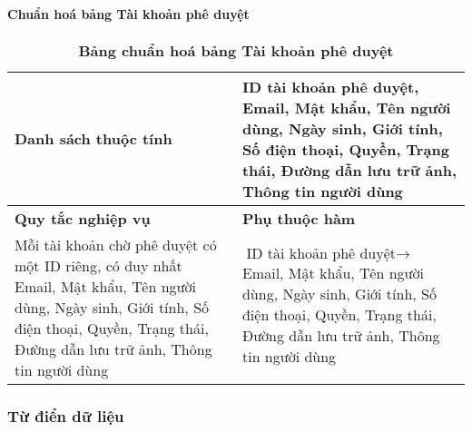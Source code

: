 \paragraph{Chuẩn hoá bảng Tài khoản phê duyệt}
\mbox{}
\begin{table}[H]
  \caption{\bfseries \fontsize{12pt}{0pt}\selectfont Bảng chuẩn hoá bảng Tài khoản phê duyệt}
  \centering
  \begin{tabularx}{0.9\textwidth}{|X|X|}
    \hline
    \textbf{Danh sách thuộc tính} & ID tài khoản phê duyệt, Email, Mật khẩu, Tên người dùng, Ngày sinh, Giới tính, Số điện thoại, Quyền, Trạng thái, Đường dẫn lưu trữ ảnh, Thông tin người dùng \\
    \hline
    \textbf{Quy tắc nghiệp vụ} & \textbf{Phụ thuộc hàm} \\
    \hline
    Mỗi tài khoản chờ phê duyệt có một ID riêng, có duy nhất Email, Mật khẩu, Tên người dùng, Ngày sinh, Giới tính,
     Số điện thoại, Quyền, Trạng thái, Đường dẫn lưu trữ ảnh, Thông tin người dùng 
    & \parbox[t]{\linewidth}{$\text{ID tài khoản phê duyệt} \rightarrow$ Email, Mật khẩu, Tên người dùng, Ngày sinh, Giới tính,
    Số điện thoại, Quyền, Trạng thái, Đường dẫn lưu trữ ảnh, Thông tin người dùng} \\
    \hline
     \\
     \\
    \hline
  \end{tabularx}
\end{table}

\subsubsection{Từ điển dữ liệu}

